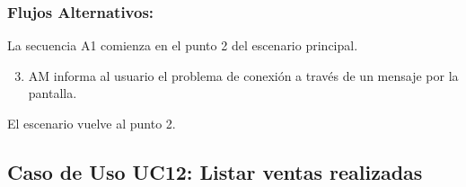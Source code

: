 \begin{framed}
\subsubsection{Flujos Alternativos: }

La secuencia A1 comienza en el punto 2 del escenario principal.
\begin{enumerate}
    \setcounter{enumi}{2}
    \item AM informa al usuario el problema de conexión a través de un mensaje por la pantalla.
\end{enumerate}
El escenario vuelve al punto 2.

\end{framed}



\subsection{Caso de Uso UC12: Listar ventas realizadas}

